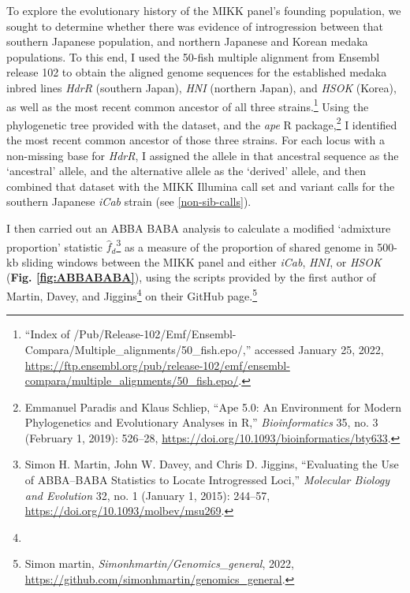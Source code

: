 \documentclass[
  9pt,
]{book}
\begin{document}
To explore the evolutionary history of the MIKK panel's founding population, we sought to determine whether there was evidence of introgression between that southern Japanese population, and northern Japanese and Korean medaka populations. To this end, I used the 50-fish multiple alignment from Ensembl release 102 to obtain the aligned genome sequences for the established medaka inbred lines \emph{HdrR} (southern Japan), \emph{HNI} (northern Japan), and \emph{HSOK} (Korea), as well as the most recent common ancestor of all three strains.\footnote{{``Index of /Pub/Release-102/Emf/Ensembl-Compara/Multiple\_alignments/50\_fish.epo/,''} accessed January 25, 2022, \url{https://ftp.ensembl.org/pub/release-102/emf/ensembl-compara/multiple_alignments/50_fish.epo/}.} Using the phylogenetic tree provided with the dataset, and the \emph{ape} R package,\footnote{Emmanuel Paradis and Klaus Schliep, {``Ape 5.0: An Environment for Modern Phylogenetics and Evolutionary Analyses in {R},''} \emph{Bioinformatics} 35, no. 3 (February 1, 2019): 526--28, \url{https://doi.org/10.1093/bioinformatics/bty633}.} I identified the most recent common ancestor of those three strains. For each locus with a non-missing base for \emph{HdrR}, I assigned the allele in that ancestral sequence as the `ancestral' allele, and the alternative allele as the `derived' allele, and then combined that dataset with the MIKK Illumina call set and variant calls for the southern Japanese \emph{iCab} strain (see \ref{non-sib-calls}).

I then carried out an ABBA BABA analysis to calculate a modified `admixture proportion' statistic \(\hat{f}_d\)\footnote{Simon H. Martin, John W. Davey, and Chris D. Jiggins, {``Evaluating the {Use} of {ABBA}--{BABA Statistics} to {Locate Introgressed Loci},''} \emph{Molecular Biology and Evolution} 32, no. 1 (January 1, 2015): 244--57, \url{https://doi.org/10.1093/molbev/msu269}.} as a measure of the proportion of shared genome in 500-kb sliding windows between the MIKK panel and either \emph{iCab}, \emph{HNI}, or \emph{HSOK} (\textbf{Fig. \ref{fig:ABBABABA}}), using the scripts provided by the first author of Martin, Davey, and Jiggins\footnote{} on their GitHub page.\footnote{Simon martin, \emph{Simonhmartin/Genomics\_general}, 2022, \url{https://github.com/simonhmartin/genomics_general}.}
\end{document}
